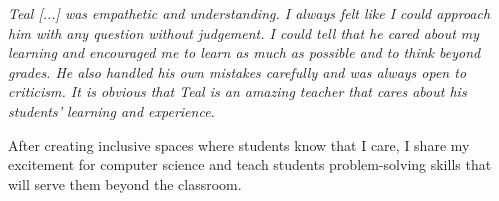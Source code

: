 \documentclass[11pt]{article}
\begin{document}
{\begin{displayquote}
	\textit{Teal [...] was empathetic and understanding. I always felt like I could approach him with any question without judgement. I could tell that he cared about my learning and encouraged me to learn as much as possible and to think beyond grades. He also handled his own mistakes carefully and was always open to criticism. It is obvious that Teal is an amazing teacher that cares about his students' learning and experience.}
\end{displayquote}

After creating inclusive spaces where students know that I care, I share my excitement for computer science and teach students problem-solving skills that will serve them beyond the classroom.
}
\end{document}
